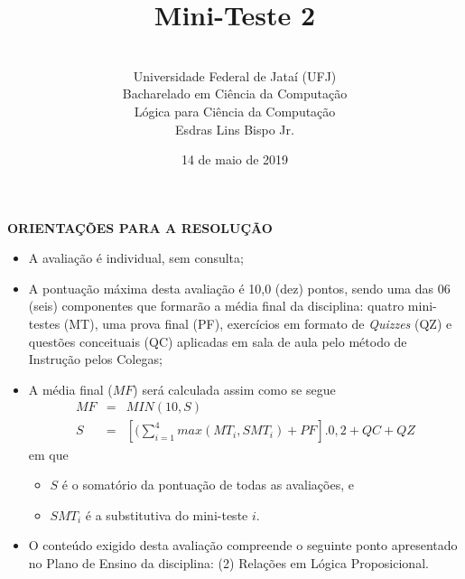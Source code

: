 \documentclass[12pt,a4paper,oneside]{article}
\author{\\Universidade Federal de Jataí (UFJ)\\Bacharelado em Ciência da Computação \\Lógica para Ciência da Computação \\Esdras Lins Bispo Jr.}
\date{14 de maio de 2019}
\title{\sc \huge Mini-Teste 2}
\begin{document}
\maketitle

{\bf ORIENTAÇÕES PARA A RESOLUÇÃO}

\small
 
\begin{itemize}
	\item A avaliação é individual, sem consulta;
	\item A pontuação máxima desta avaliação é 10,0 (dez) pontos, sendo uma das 06 (seis) componentes que formarão a média final da disciplina: quatro mini-testes (MT), uma prova final (PF), exercícios em formato de {\it Quizzes} (QZ) e questões conceituais (QC) aplicadas em sala de aula pelo método de Instrução pelos Colegas;
	\item A média final ($MF$) será calculada assim como se segue
	\begin{eqnarray}
		MF & = & MIN(10, S) \nonumber \\
		S & = & [(\sum_{i=1}^{4} max(MT_i, SMT_i ) + PF].0,2  + QC + QZ\nonumber
	\end{eqnarray}
	em que 
	\begin{itemize}
		\item $S$ é o somatório da pontuação de todas as avaliações, e
		\item $SMT_i$ é a substitutiva do mini-teste $i$.
	\end{itemize}
	\item O conteúdo exigido desta avaliação compreende o seguinte ponto apresentado no Plano de Ensino da disciplina: (2) Relações em Lógica Proposicional.
\end{itemize}

\begin{center}
\end{center}

\newpage
\end{document}
